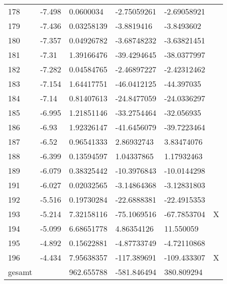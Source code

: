 \begin{longtable}{XXXXXX}
    178   & -7.498 & 0.0600034 & -2.75059261 & -2.69058921 &  \\
    179   & -7.436 & 0.03258139 & -3.8819416 & -3.8493602 &  \\
    180   & -7.357 & 0.04926782 & -3.68748232 & -3.63821451 &  \\
    181   & -7.31 & 1.39166476 & -39.4294645 & -38.0377997 &  \\
    182   & -7.282 & 0.04584765 & -2.46897227 & -2.42312462 &  \\
    183   & -7.154 & 1.64417751 & -46.0412125 & -44.397035 &  \\
    184   & -7.14 & 0.81407613 & -24.8477059 & -24.0336297 &  \\
    185   & -6.995 & 1.21851146 & -33.2754464 & -32.056935 &  \\
    186   & -6.93 & 1.92326147 & -41.6456079 & -39.7223464 &  \\
    187   & -6.52 & 0.96541333 & 2.86932743 & 3.83474076 &  \\
    188   & -6.399 & 0.13594597 & 1.04337865 & 1.17932463 &  \\
    189   & -6.079 & 0.38325442 & -10.3976843 & -10.0144298 &  \\
    191   & -6.027 & 0.02032565 & -3.14864368 & -3.12831803 &  \\
    192   & -5.516 & 0.19730284 & -22.6888381 & -22.4915353 &  \\
    193   & -5.214 & 7.32158116 & -75.1069516 & -67.7853704 & X \\
    194   & -5.099 & 6.68651778 & 4.86354126 & 11.550059 &  \\
    195   & -4.892 & 0.15622881 & -4.87733749 & -4.72110868 &  \\
    196   & -4.434 & 7.95638357 & -117.389691 & -109.433307 & X \\
    gesamt &       & 962.655788 & -581.846494 & 380.809294 &  \\
     \end{longtable}%
     
